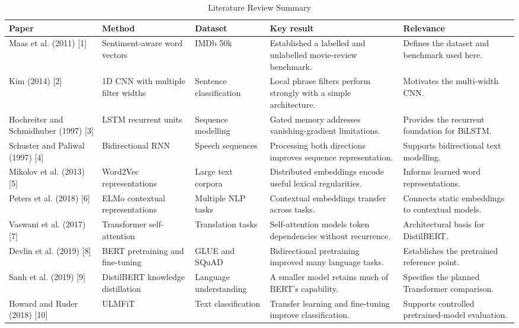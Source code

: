 \documentclass[10pt,a4paper]{article}
\begin{document}
\begin{table}[H]
\caption{Literature Review Summary}\label{tab:lit}
\centering\small\renewcommand{\arraystretch}{1.2}
\begin{tabularx}{\textwidth}{>{\raggedright\arraybackslash}p{2.5cm} >{\raggedright\arraybackslash}p{2.3cm} >{\raggedright\arraybackslash}p{1.8cm} >{\raggedright\arraybackslash}p{2.7cm} X}
\toprule
\textbf{Paper} & \textbf{Method} & \textbf{Dataset} & \textbf{Key result} & \textbf{Relevance} \\
\midrule
Maas et al. (2011) [1] & Sentiment-aware word vectors & IMDb 50k & Established a labelled and unlabelled movie-review benchmark. & Defines the dataset and benchmark used here. \\
\midrule
Kim (2014) [2] & 1D CNN with multiple filter widths & Sentence classification & Local phrase filters perform strongly with a simple architecture. & Motivates the multi-width CNN. \\
\midrule
Hochreiter and Schmidhuber (1997) [3] & LSTM recurrent units & Sequence modelling & Gated memory addresses vanishing-gradient limitations. & Provides the recurrent foundation for BiLSTM. \\
\midrule
Schuster and Paliwal (1997) [4] & Bidirectional RNN & Speech sequences & Processing both directions improves sequence representation. & Supports bidirectional text modelling. \\
\midrule
Mikolov et al. (2013) [5] & Word2Vec representations & Large text corpora & Distributed embeddings encode useful lexical regularities. & Informs learned word representations. \\
\midrule
Peters et al. (2018) [6] & ELMo contextual representations & Multiple NLP tasks & Contextual embeddings transfer across tasks. & Connects static embeddings to contextual models. \\
\midrule
Vaswani et al. (2017) [7] & Transformer self-attention & Translation tasks & Self-attention models token dependencies without recurrence. & Architectural basis for DistilBERT. \\
\midrule
Devlin et al. (2019) [8] & BERT pretraining and fine-tuning & GLUE and SQuAD & Bidirectional pretraining improved many language tasks. & Establishes the pretrained reference point. \\
\midrule
Sanh et al. (2019) [9] & DistilBERT knowledge distillation & Language understanding & A smaller model retains much of BERT's capability. & Specifies the planned Transformer comparison. \\
\midrule
Howard and Ruder (2018) [10] & ULMFiT & Text classification & Transfer learning and fine-tuning improve classification. & Supports controlled pretrained-model evaluation. \\
\bottomrule
\end{tabularx}
\end{table}
\end{document}

